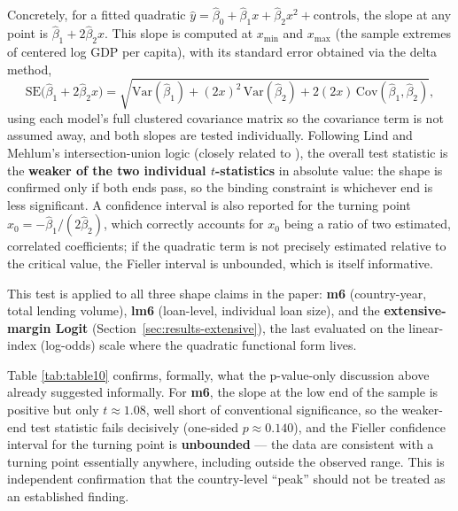 \documentclass[12pt]{article}
\begin{document}
Concretely, for a fitted quadratic $\hat{y} = \hat\beta_0 + \hat\beta_1 x + \hat\beta_2 x^2 +
\text{controls}$, the slope at any point is $\hat\beta_1 + 2\hat\beta_2 x$. This slope is computed at
$x_{\min}$ and $x_{\max}$ (the sample extremes of centered log GDP per capita), with its standard
error obtained via the delta method,
\begin{equation}
\label{eq:delta-se}
\mathrm{SE}\big(\hat\beta_1 + 2\hat\beta_2 x\big) = \sqrt{\mathrm{Var}(\hat\beta_1) +
(2x)^2\,\mathrm{Var}(\hat\beta_2) + 2(2x)\,\mathrm{Cov}(\hat\beta_1,\hat\beta_2)},
\end{equation}
using each model's full clustered covariance matrix so the covariance term is not assumed away, and
both slopes are tested individually. Following Lind and Mehlum's intersection-union logic (closely
related to \citealp{sasabuchi1980}), the overall test statistic is the \textbf{weaker of the two
individual $t$-statistics} in absolute value: the shape is confirmed only if both ends pass, so the
binding constraint is whichever end is less significant. A \citet{fieller1954} confidence interval is
also reported for the turning point $x_0 = -\hat\beta_1/(2\hat\beta_2)$, which correctly accounts for
$x_0$ being a ratio of two estimated, correlated coefficients; if the quadratic term is not precisely
estimated relative to the critical value, the Fieller interval is unbounded, which is itself
informative.

This test is applied to all three shape claims in the paper: \textbf{m6} (country-year, total lending
volume), \textbf{lm6} (loan-level, individual loan size), and the \textbf{extensive-margin Logit}
(Section~\ref{sec:results-extensive}), the last evaluated on the linear-index (log-odds) scale where
the quadratic functional form lives.



Table \ref{tab:table10} confirms, formally, what the p-value-only
discussion above already suggested informally. For \textbf{m6}, the slope at the low end of the sample
is positive but only $t\approx1.08$, well short of conventional significance, so the weaker-end test
statistic fails decisively (one-sided $p\approx0.140$), and the Fieller confidence interval for the
turning point is \textbf{unbounded} --- the data are consistent with a turning point essentially
anywhere, including outside the observed range. This is independent confirmation that the
country-level ``peak'' should not be treated as an established finding.
\end{document}

